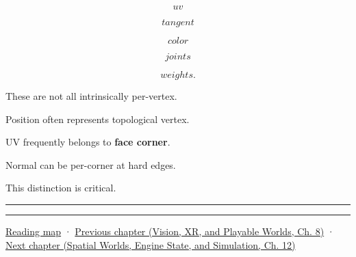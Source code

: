 \[
uv
\]

\[
tangent
\]

\[
color
\]

\[
joints
\]

\[
weights.
\]

These are not all intrinsically per-vertex.

Position often represents topological vertex.

UV frequently belongs to \textbf{face corner}.

Normal can be per-corner at hard edges.

This distinction is critical.

\begin{center}\rule{0.5\linewidth}{0.5pt}\end{center}

\begin{center}\rule{0.5\linewidth}{0.5pt}\end{center}

\hyperref[volume-reading-map]{Reading map} · \href{../07-Vision-XR-and-Playable-Worlds/main.pdf\#nameddest=04-visual-computing-ii-ch039-tiling-ordering-and-compositing-at-scale}{Previous chapter (Vision, XR, and Playable Worlds, Ch. 8)} · \href{../05-Spatial-Worlds-Engine-State-and-Simulation/main.pdf\#nameddest=04-visual-computing-ii-ch041-per-vertex-and-per-corner-mesh-attributes}{Next chapter (Spatial Worlds, Engine State, and Simulation, Ch. 12)}
